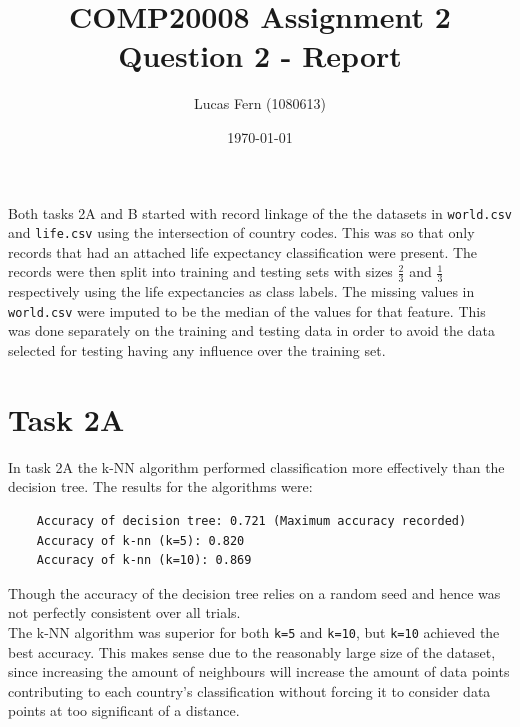 \documentclass{article}
\title{COMP20008 Assignment 2 \\Question 2 - Report}
\date{\today}
\author{Lucas Fern (1080613)}
\begin{document}
\maketitle
Both tasks 2A and B started with record linkage of the the datasets in \verb|world.csv| and \verb|life.csv| using the intersection of country codes. This was so that only records that had an attached life expectancy classification were present. The records were then split into training and testing sets with sizes $\frac{2}{3}$ and $\frac{1}{3}$ respectively using the life expectancies as class labels. The missing values in \verb|world.csv| were imputed to be the median of the values for that feature. This was done separately on the training and testing data in order to avoid the data selected for testing having any influence over the training set.
\section*{Task 2A}
In task 2A the k-NN algorithm performed classification more effectively than the decision tree. The results for the algorithms were:
\begin{verbatim}
    Accuracy of decision tree: 0.721 (Maximum accuracy recorded)
    Accuracy of k-nn (k=5): 0.820
    Accuracy of k-nn (k=10): 0.869
\end{verbatim}
Though the accuracy of the decision tree relies on a random seed and hence was not perfectly consistent over all trials.\\[2mm]
The k-NN algorithm was superior for both \verb|k=5| and \verb|k=10|, but \verb|k=10| achieved the best accuracy. This makes sense due to the reasonably large size of the dataset, since increasing the amount of neighbours will increase the amount of data points contributing to each country's classification without forcing it to consider data points at too significant of a distance.
\end{document}
